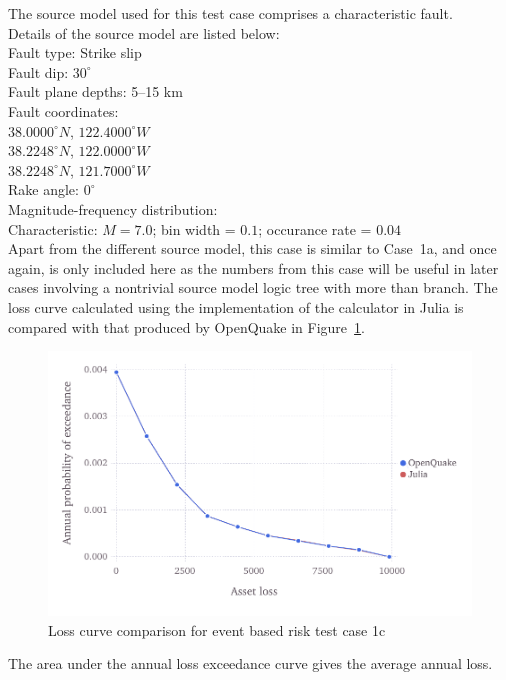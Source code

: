 The source model used for this test case comprises a characteristic fault.\\

\noindent Details of the source model are listed below:\\

\noindent
Fault type: Strike slip\\
Fault dip: $30^{\circ}$\\
Fault plane depths: 5--15 km\\
Fault coordinates:\\
$38.0000^{\circ} N$, $122.4000^{\circ} W$\\
$38.2248^{\circ} N$, $122.0000^{\circ} W$\\
$38.2248^{\circ} N$, $121.7000^{\circ} W$\\
Rake angle: $0^{\circ}$\\
Magnitude-frequency distribution:\\
Characteristic: $M = 7.0$; bin width = $0.1$; occurance rate = $0.04$\\

Apart from the different source model, this case is similar to Case~1a, and once again, is only included here as the numbers from this case will be useful in later cases involving a nontrivial source model logic tree with more than branch. The loss curve calculated using the implementation of the calculator in Julia is compared with that produced by OpenQuake in Figure~\ref{fig:lc-ebr-1c}.

\begin{figure}[htbp]
\centering
\includegraphics[width=12cm]{qareport/figures/fig-lc-ebr-1c}
\caption{Loss curve comparison for event based risk test case 1c}
\label{fig:lc-ebr-1c}
\end{figure}

The area under the annual loss exceedance curve gives the average annual loss.
